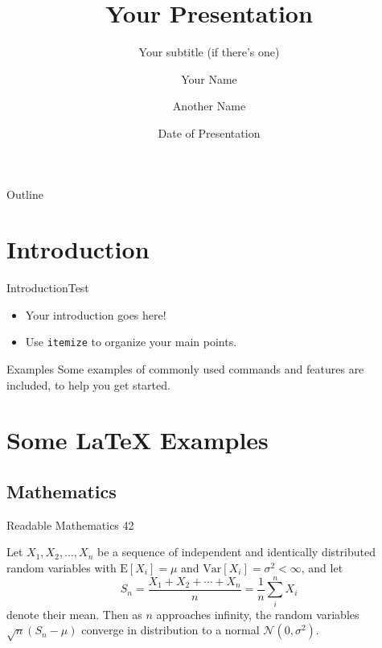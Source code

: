 \documentclass[10pt]{beamer}
\title[Your Short Title]{Your Presentation}
\subtitle{Your subtitle (if there's one)}
\author[\MakeUppercase{Your name (short)}]{Your Name \and Another Name}  %
\institute{Your Faculty/Department}
\date{Date of Presentation}
\begin{document}
{  %
\begin{frame}  %
  \titlepage
\end{frame}
}


\begin{frame}{Outline}
  \hypersetup{linkcolor=black}
  \tableofcontents[sectionstyle=shaded/show, hideallsubsections]
\end{frame}

\section{Introduction}

\begin{frame}{Introduction}{Test}

\begin{itemize}
  \item Your introduction goes here!
  \item Use \texttt{itemize} to organize your main points.
\end{itemize}

\begin{block}{Examples}
Some examples of commonly used commands and features are included, to help you get started.
\end{block}

\end{frame}

\section{Some \LaTeX{} Examples}

\subsection{Mathematics}

\begin{frame}{Readable Mathematics 42}

Let $X_1, X_2, \ldots, X_n$ be a sequence of independent and identically distributed random variables with $\text{E}[X_i] = \mu$ and $\text{Var}[X_i] = \sigma^2 < \infty$, and let
$$S_n = \frac{X_1 + X_2 + \cdots + X_n}{n}
      = \frac{1}{n}\sum_{i}^{n} X_i$$
denote their mean. Then as $n$ approaches infinity, the random variables $\sqrt{n}(S_n - \mu)$ converge in distribution to a normal $\mathcal{N}(0, \sigma^2)$.

\end{frame}
\end{document}
